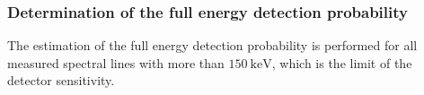 \subsubsection{Determination of the full energy detection probability}
\label{subsubsec:determinationfep}
The estimation of the full energy detection probability is performed for
all measured spectral lines with more than $\SI{150}{\kilo\electronvolt}$,
which is the limit of the detector sensitivity.

